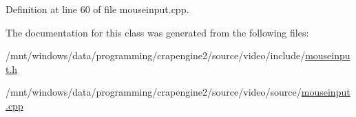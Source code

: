 Definition at line 60 of file mouseinput.\+cpp.



The documentation for this class was generated from the following files\+:\begin{DoxyCompactItemize}
\item 
/mnt/windows/data/programming/crapengine2/source/video/include/\hyperlink{mouseinput_8h}{mouseinput.\+h}\item 
/mnt/windows/data/programming/crapengine2/source/video/source/\hyperlink{mouseinput_8cpp}{mouseinput.\+cpp}\end{DoxyCompactItemize}
